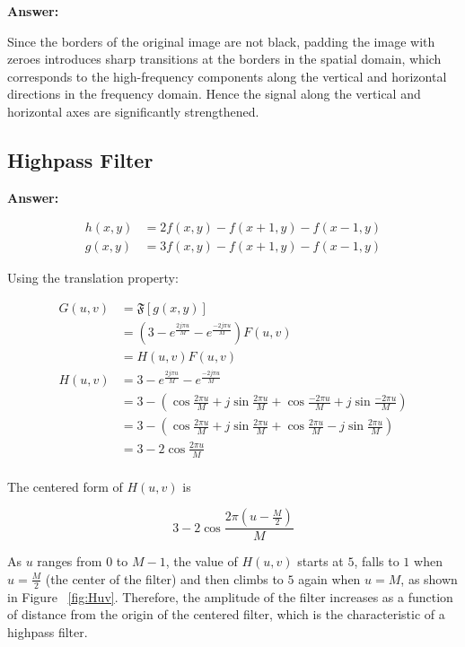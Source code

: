 \documentclass{article}
\begin{document}
\textbf{Answer:}

Since the borders of the original image are not black, padding the image with zeroes introduces sharp transitions at the borders in the spatial domain, which corresponds to the high-frequency components along the vertical and horizontal directions in the frequency domain. Hence the signal along the vertical and horizontal axes are significantly strengthened.

\subsection{Highpass Filter}

\textbf{Answer:}

\begin{align*} 
h(x, y) &
= 2 f(x, y) - f(x+1, y) - f(x-1, y) \\
g(x, y) &
= 3 f(x, y) - f(x+1, y) - f(x-1, y)
\end{align*}

Using the translation property:

\begin{align*} 
G(u, v) & = \mathfrak{F}[g(x, y)] \\
& = (3 - e^{\frac{2j\pi u}{M}} - e^{\frac{-2j\pi u}{M}})F(u, v)\\
& = H(u, v) F(u, v) \\
H(u, v) & = 3 - e^{\frac{2j\pi u}{M}} - e^{\frac{-2j\pi u}{M}} \\
& = 3 - (\cos{\frac{2\pi u}{M}} + j\sin{\frac{2\pi u}{M}} + \cos{\frac{-2\pi u}{M}} + j\sin{\frac{-2\pi u}{M}}) \\
& = 3 - (\cos{\frac{2\pi u}{M}} + j\sin{\frac{2\pi u}{M}} + \cos{\frac{2\pi u}{M}} - j\sin{\frac{2\pi u}{M}}) \\
& = 3 - 2\cos{\frac{2\pi u}{M}} \\
\end{align*}

The centered form of $H(u, v)$ is

$$
3 - 2\cos{\frac{2\pi (u -\frac{M}{2})}{M}}
$$

As $u$ ranges from $0$ to $M − 1$, the value of
$H(u, v)$ starts at $5$, falls to $1$ when $u = \frac{M}{2}$ (the center of
the filter) and then climbs to $5$ again when $u = M$, as shown in Figure ~\ref{fig:Huv}. Therefore, the amplitude of the filter increases as a function of distance from the origin of the centered filter, which is the characteristic of a highpass filter.
\end{document}
